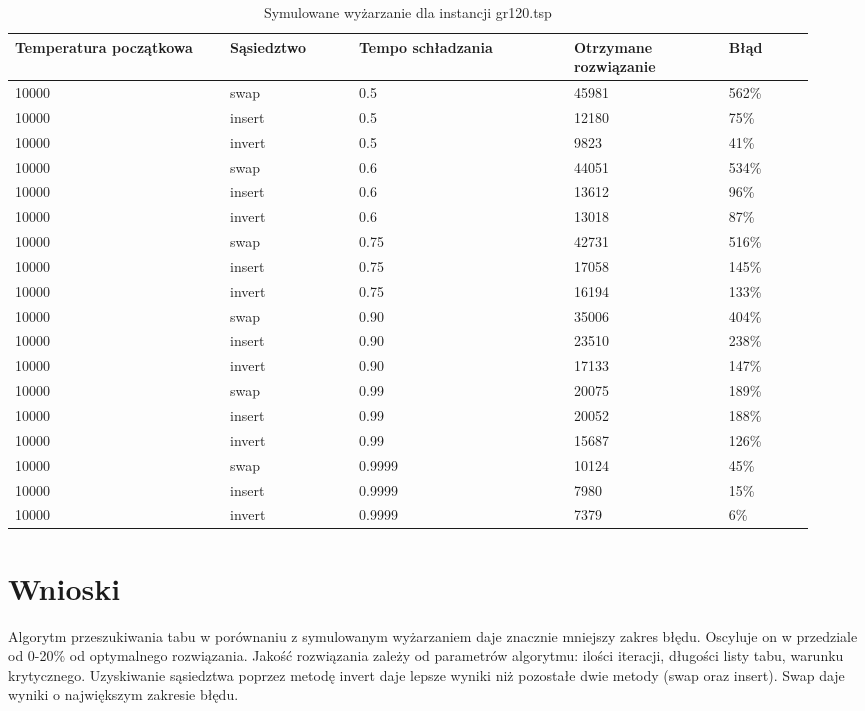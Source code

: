 \documentclass[12pt,a4paper,titlepage]{article}
\begin{document}
\begin{table}[H]
    \centering
	{\begin{tabular}{|p{0.25\linewidth}p{0.15\linewidth}p{0.25\linewidth}p{0.18\linewidth}p{0.1\linewidth}|}
		\hline
        Temperatura początkowa & Sąsiedztwo & Tempo schładzania & Otrzymane rozwiązanie & Błąd \\
		\hline
        10000 & swap&0.5 & 45981 & 562\% \\
        10000 & insert&0.5 & 12180 & 75\% \\
        10000 & invert&0.5 & 9823 & 41\% \\
        \hline
        10000 &swap& 0.6 & 44051 & 534\% \\
        10000 &insert& 0.6 & 13612 & 96\% \\
        10000 &invert& 0.6 & 13018 & 87\% \\
        \hline
        10000 &swap& 0.75 & 42731 & 516\% \\
        10000 &insert& 0.75 & 17058 & 145\% \\
        10000 &invert& 0.75 & 16194 & 133\% \\
        \hline
        10000 &swap& 0.90 & 35006 & 404\% \\
        10000 &insert& 0.90 & 23510 & 238\% \\
        10000 &invert& 0.90 & 17133 & 147\% \\
        \hline
        10000 &swap& 0.99 & 20075 & 189\% \\
        10000 &insert& 0.99 & 20052 & 188\% \\
        10000 &invert& 0.99 & 15687 & 126\% \\
        \hline
        10000 &swap& 0.9999 & 10124 & 45\% \\
        10000 &insert& 0.9999 & 7980 & 15\% \\
        10000 &invert& 0.9999 & 7379 & 6\% \\
        \hline
	\end{tabular}}
	\caption{Symulowane wyżarzanie dla instancji gr120.tsp}
\end{table}

\section{Wnioski}
Algorytm przeszukiwania tabu w porównaniu z symulowanym wyżarzaniem daje znacznie mniejszy zakres błędu. Oscyluje on w przedziale od 0-20\% od optymalnego rozwiązania. Jakość rozwiązania zależy od parametrów algorytmu: ilości iteracji, długości listy tabu, warunku krytycznego. Uzyskiwanie sąsiedztwa poprzez metodę invert daje lepsze wyniki niż pozostałe dwie metody (swap oraz insert). Swap daje wyniki o największym zakresie błędu.
\end{document}
